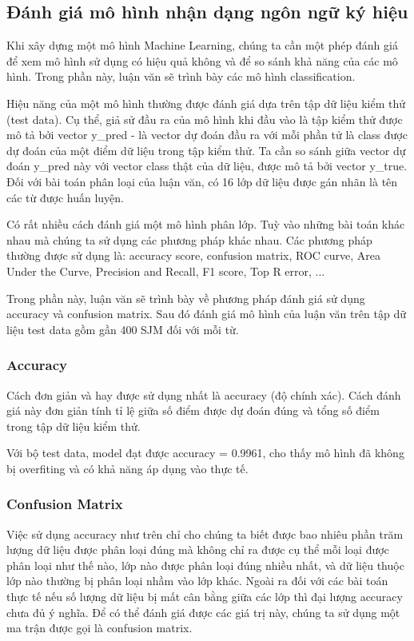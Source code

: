 \subsection{Đánh giá mô hình nhận dạng ngôn ngữ ký hiệu}
Khi xây dựng một mô hình Machine Learning, chúng ta cần một phép đánh giá để xem mô hình sử dụng có hiệu quả không và để so sánh khả năng của các mô hình. Trong phần này, luận văn sẽ trình bày các mô hình classification.

Hiệu năng của một mô hình thường được đánh giá dựa trên tập dữ liệu kiểm thử (test data). Cụ thể, giả sử đầu ra của mô hình khi đầu vào là tập kiểm thử được mô tả bởi vector y\_pred - là vector dự đoán đầu ra với mỗi phần tử là class được dự đoán của một điểm dữ liệu trong tập kiểm thử. Ta cần so sánh giữa vector dự đoán y\_pred này với vector class thật của dữ liệu, được mô tả bởi vector y\_true. Đối với bài toán phân loại của luận văn, có 16 lớp dữ liệu được gán nhãn là tên các từ được huấn luyện.


Có rất nhiều cách đánh giá một mô hình phân lớp. Tuỳ vào những bài toán khác nhau mà chúng ta sử dụng các phương pháp khác nhau. Các phương pháp thường được sử dụng là: accuracy score, confusion matrix, ROC curve, Area Under the Curve, Precision and Recall, F1 score, Top R error, ...

Trong phần này, luận văn sẽ trình bày về phương pháp đánh giá sử dụng accuracy và confusion matrix. Sau đó đánh giá mô hình của luận văn trên tập dữ liệu test data gồm gần 400 SJM đối với mỗi từ.

\subsubsection{Accuracy}
Cách đơn giản và hay được sử dụng nhất là accuracy (độ chính xác). Cách đánh giá này đơn giản tính tỉ lệ giữa số điểm được dự đoán đúng và tổng số điểm trong tập dữ liệu kiểm thử.

Với bộ test data, model đạt được accuracy = 0.9961, cho thấy mô hình đã không bị overfiting và có khả năng áp dụng vào thực tế.
\subsubsection{Confusion Matrix}
Việc sử dụng accuracy như trên chỉ cho chúng ta biết được bao nhiêu phần trăm lượng dữ liệu được phân loại đúng mà không chỉ ra được cụ thể mỗi loại được phân loại như thế nào, lớp nào được phân loại đúng nhiều nhất, và dữ liệu thuộc lớp nào thường bị phân loại nhầm vào lớp khác. Ngoài ra đối với các bài toán thực tế nếu số lượng dữ liệu bị mất cân bằng giữa các lớp thì đại lượng accuracy chưa đủ ý nghĩa. Để có thể đánh giá được các giá trị này, chúng ta sử dụng một ma trận được gọi là confusion matrix.

